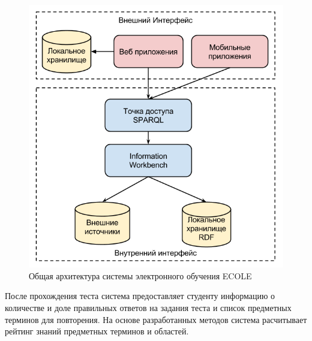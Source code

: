\begin{figure}[ht] 
  \center
  \includegraphics[scale=0.45]{OverallArch}
  \caption{Общая архитектура системы электронного обучения ECOLE} 
  \label{fig:OverallArch}
\end{figure}


После прохождения теста система предоставляет студенту информацию о количестве и доле правильных ответов на задания теста и список предметных терминов для повторения. На основе разработанных методов система расчитывает рейтинг знаний предметных терминов и областей.   



